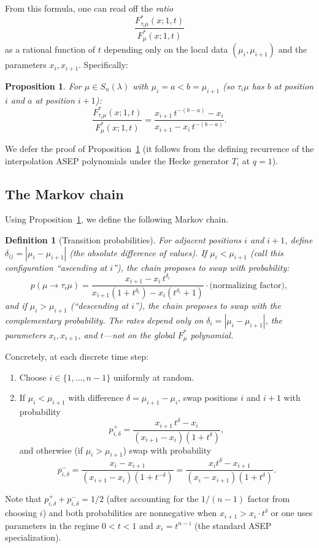 \documentclass[12pt]{article}
\newtheorem{proposition}[theorem]{Proposition}
\newtheorem{definition}[theorem]{Definition}
\begin{document}
From this formula, one can read off the \emph{ratio}
\[
  \frac{F^*_{\tau_i\mu}(x;1,t)}{F^*_\mu(x;1,t)}
\]
as a rational function of $t$ depending only on the local data $(\mu_i, \mu_{i+1})$ and the parameters $x_i, x_{i+1}$.  Specifically:

\begin{proposition}
  \label{prop:ratio}
  For $\mu \in S_n(\lambda)$ with $\mu_i = a < b = \mu_{i+1}$ (so $\tau_i\mu$ has $b$ at position $i$ and $a$ at position $i+1$):
  \[
    \frac{F^*_{\tau_i\mu}(x;1,t)}{F^*_\mu(x;1,t)}
    = \frac{x_{i+1}\,t^{-(b-a)} - x_i}{x_{i+1} - x_i\,t^{-(b-a)}}.
  \]
\end{proposition}

We defer the proof of Proposition~\ref{prop:ratio} (it follows from the defining recurrence of the interpolation ASEP polynomials under the Hecke generator $T_i$ at $q=1$).

\subsection*{The Markov chain}

Using Proposition~\ref{prop:ratio}, we define the following Markov chain.

\begin{definition}[Transition probabilities]
  For adjacent positions $i$ and $i+1$, define $\delta_{ij} = |\mu_i - \mu_{i+1}|$ (the absolute difference of values).  If $\mu_i < \mu_{i+1}$ (call this configuration ``ascending at $i$''), the chain proposes to swap with probability:
  \[
    p(\mu \to \tau_i\mu) = \frac{x_{i+1} - x_i\,t^{\delta_i}}{x_{i+1}(1 + t^{\delta_i}) - x_i(t^{\delta_i} + 1)}\cdot\text{(normalizing factor)},
  \]
  and if $\mu_i > \mu_{i+1}$ (``descending at $i$''), the chain proposes to swap with the complementary probability.  The rates depend only on $\delta_i = |\mu_i - \mu_{i+1}|$, the parameters $x_i, x_{i+1}$, and $t$---\emph{not} on the global $F^*_\mu$ polynomial.
\end{definition}

Concretely, at each discrete time step:
\begin{enumerate}
  \item Choose $i \in \{1,\ldots,n-1\}$ uniformly at random.
  \item If $\mu_i < \mu_{i+1}$ with difference $\delta = \mu_{i+1}-\mu_i$, swap positions $i$ and $i+1$ with probability
  \[
    p_{i,\delta}^+ = \frac{x_{i+1}\,t^\delta - x_i}{(x_{i+1}-x_i)(1 + t^\delta)},
  \]
  and otherwise (if $\mu_i > \mu_{i+1}$) swap with probability
  \[
    p_{i,\delta}^- = \frac{x_i - x_{i+1}}{(x_{i+1}-x_i)(1+t^{-\delta})} = \frac{x_i t^\delta - x_{i+1}}{(x_i - x_{i+1})(1+t^\delta)}.
  \]
\end{enumerate}
Note that $p_{i,\delta}^+ + p_{i,\delta}^- = 1/2$ (after accounting for the $1/(n-1)$ factor from choosing $i$) and both probabilities are nonneg\-ative when $x_{i+1} > x_i\cdot t^\delta$ or one uses parameters in the regime $0 < t < 1$ and $x_i = t^{n-i}$ (the standard ASEP specialization).
\end{document}
